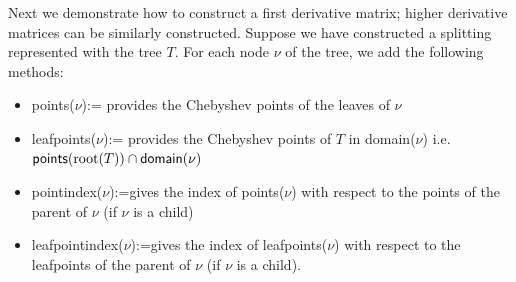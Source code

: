 Next we demonstrate how to construct a first derivative matrix; higher derivative matrices can be similarly constructed.  Suppose we have constructed a splitting represented with the tree $T$. For each node $\nu$ of the tree, we add the following methods:
\begin{itemize}
\item \textsf{points}($\nu$):= provides the Chebyshev points of the leaves of $\nu$
\item \textsf{leafpoints}($\nu$):= provides the Chebyshev points of $T$ in \textsf{domain}($\nu$) i.e. \newline $\text{\textsf{points}(root($T$))} \cap \text{\textsf{domain}($\nu$)}$
\item \textsf{pointindex}($\nu$):=gives the index of \textsf{points}($\nu$) with respect to the points of the parent of $\nu$ (if $\nu$ is a child)
\item \textsf{leafpointindex}($\nu$):=gives the index of \textsf{leafpoints}($\nu$) with respect to the leafpoints of the parent of $\nu$ (if $\nu$ is a child).
\end{itemize}





